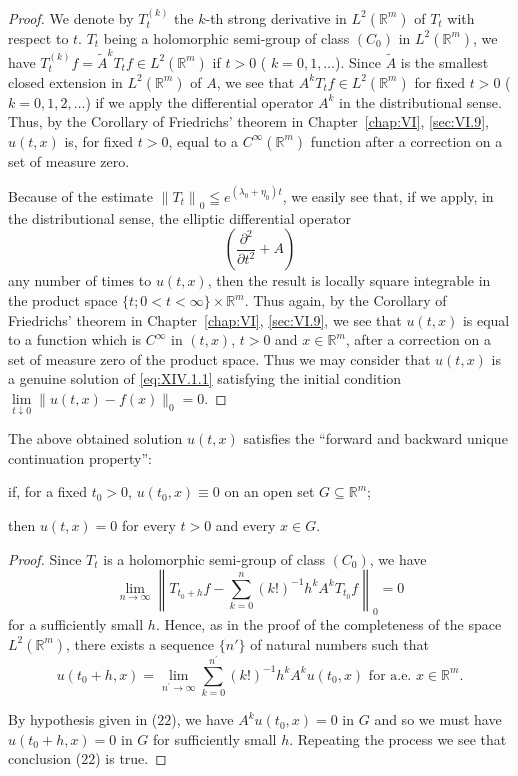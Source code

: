 \begin{proof}
 We denote by $T_{t}^{(k)}$ the $k$-th strong derivative in $L^2(\mathbb{R}^{m})$ of $T_{t}$ with respect to $t$. $T_{t}$ being a holomorphic semi-group of class $(C_0)$ in $L^2(\mathbb{R}^{m})$, we have $T_{t}^{(k)}f = \tilde{A}^{k}T_{t}f\in L^{2}(\mathbb{R}^{m})$ if $t > 0$ ( $k = 0,1,\ldots$). Since $\tilde{A}$ is the smallest closed extension in $L^2(\mathbb{R}^{m})$ of $A$, we see that $A^{k}T_{t}f\in L^{2}(\mathbb{R}^{m})$ for fixed $t > 0$ ( $k = 0,1,2,\ldots$) if we apply the differential operator $A^{k}$ in the distributional sense. Thus, by the Corollary of Friedrichs' theorem in Chapter~\ref{chap:VI}, \ref{sec:VI.9}, $u(t,x)$ is, for fixed $t > 0$, equal to a $C^\infty(\mathbb{R}^{m})$ function after a correction on a set of measure zero. 


Because of the estimate $\left\|T_{t}\right\|_{0}\leqq e^{(\lambda_{0}+\eta_{0})t}$, we easily see that, if we apply, in the distributional sense, the elliptic differential operator 
\[
\left(\frac {\partial^{2}}{\partial t ^{2}} + A\right)
\]
any number of times to $u(t, x)$, then the result is locally square integrable in the product space $\{t; 0 < t < \infty\} \times \mathbb{R}^{m}$. Thus again, by the Corollary of Friedrichs' theorem in Chapter~\ref{chap:VI}, \ref{sec:VI.9}, we see that $u(t, x)$ is equal to a function which is $C^\infty$ in $(t, x)$, $t > 0$ and $x \in \mathbb{R}^{m}$, after a correction on a set of measure zero of the product space. Thus we may consider that $u(t, x)$ is a genuine solution of \eqref{eq:XIV.1.1} satisfying the initial condition $\lim\limits_{t \downarrow 0} \| u(t, x) - f(x) \|_0 = 0$.
\end{proof}

\begin{remarku} The above obtained solution $u(t, x)$ satisfies the ``forward and backward unique continuation property'': 
\end{remarku}

if, for a fixed $t_0 > 0$, $u(t_0, x) \equiv 0$ on an open set $G \subseteq \mathbb{R}^{m}$; 


then $u(t, x) = 0$ for every $t > 0$ and every $x \in G$. 

\begin{proof}
 Since $T_{t}$ is a holomorphic semi-group of class $(C_0)$, we have 
\[
\lim\limits _{n \rightarrow \infty} \left\| T _ {t _{0} + h} f - \sum\limits_{k=0} ^{n} (k!) ^{-1} h ^{k} A ^{k} T _ {t _{0}} f \right\| _{0} = 0
\]
for a sufficiently small $h$. Hence, as in the proof of the completeness of the space $L^2(\mathbb{R}^{m})$, there exists a sequence $\{n'\}$ of natural numbers such that 
\[
u \left(t _{0} + h, x\right) = \lim\limits _ {n ^{\prime} \rightarrow \infty} \sum\limits_{k=0} ^ {n ^{\prime}} (k!) ^{-1} h ^{k} A ^{k} u \left(t _{0}, x\right) \text{ for a.e. } x \in \mathbb{R}^{m}. \]

By hypothesis given in ($22$), we have $A^{k}u(t_{0}, x) = 0$ in $G$ and so we must have $u(t_{0} + h, x) = 0$ in $G$ for sufficiently small $h$. Repeating the process we see that conclusion ($22$) is true. 
\end{proof}

